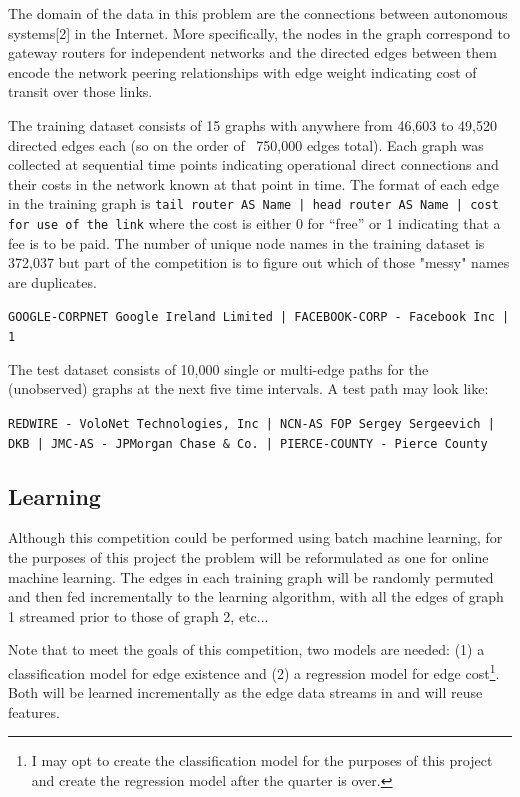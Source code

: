 \documentclass{article} %
\begin{document}
The domain of the data in this problem are the connections between
autonomous systems[2] in the Internet.  More specifically, the nodes in the
graph correspond to gateway routers for independent networks and the directed
edges between them encode the network peering relationships with edge weight indicating cost of
transit over those links.

The training dataset consists of 15 graphs with anywhere from 46,603 to 49,520 directed edges each (so on the
order of ~750,000 edges total).  Each graph was collected at sequential time
points indicating operational direct connections and their costs in the
network known at that point in time.  The format of each edge in the
training graph is \texttt{tail router AS Name | head router AS
  Name | cost for use of the link} where the cost is either 0 for ``free'' or 1
indicating that a fee is to be paid.  The number of unique node names in the
training dataset is 372,037 but part of the competition is to figure out
which of those "messy" names are duplicates.  

\texttt{GOOGLE-CORPNET Google Ireland Limited | FACEBOOK-CORP - Facebook Inc | 1}

The test dataset consists of 10,000 single or multi-edge paths for the (unobserved)
graphs at the next five time intervals.  A test path may look like:

\texttt{REDWIRE - VoloNet Technologies, Inc | NCN-AS FOP Sergey Sergeevich | DKB | JMC-AS - JPMorgan Chase \& Co. | PIERCE-COUNTY - Pierce County}

\subsection{Learning}

Although this competition could be performed using batch machine learning,
for the purposes of this project the problem will be reformulated as one for
online machine learning.  The edges in each training graph will be randomly
permuted and then fed incrementally to the learning algorithm, with all the
edges of graph 1 streamed prior to those of graph 2, etc...

Note that to meet the goals of this competition, two models are needed: (1)
a classification model for edge existence and (2) a regression model for
edge cost\footnote{I may opt to create the classification model for the
  purposes of this project and create the regression model after the quarter
is over.}.  Both will be learned incrementally as the edge data streams in
and will reuse features.
\end{document}
